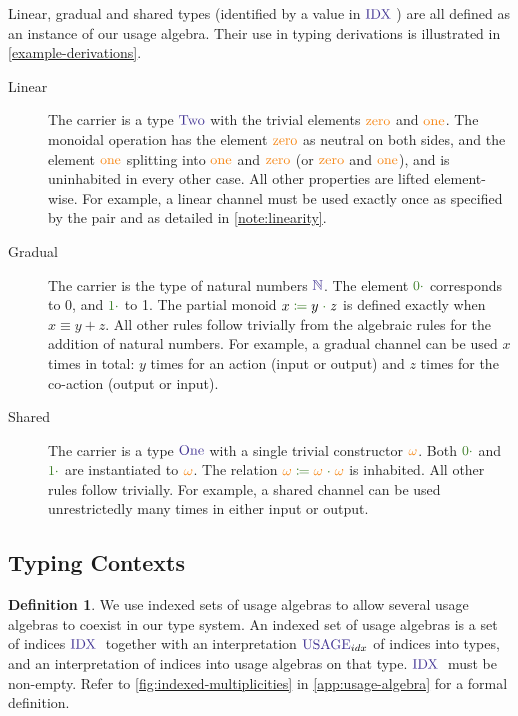 \documentclass[a4paper,UKenglish,cleveref,autoref,thm-restate,authorcolumns]{lipics-v2019}
\theoremstyle{definition}
\newtheorem{nidefinition}[theorem]{Definition}
\newcommand{\type}[1]{\textcolor{BlueViolet}{\operatorname{#1}}}
\newcommand{\constr}[1]{\textcolor{BurntOrange}{\operatorname{#1}}}
\newcommand{\func}[1]{\textcolor{OliveGreen}{\operatorname{#1}}}
\newcommand{\op}[3]{#1 \; \func{\coloneqq} \; #2 \; \func{\cdot} \; #3}
\newcommand{\zero}{\func{0\cdot}}
\newcommand{\one}{\func{1\cdot}}
\newcommand{\Idx}{\type{IDX}\;}
\newcommand{\Usage}{\type{USAGE}}
\newcommand{\N}{\type{\mathbb{N}}}
\begin{document}
Linear, gradual and shared types (identified by a value in $\Idx$) are all defined as an instance of our usage algebra.
Their use in typing derivations is illustrated in \autoref{example-derivations}.
\begin{description}
  \item [Linear]
    The carrier is a type $\type{Two}$ with the trivial elements $\constr{zero}$ and $\constr{one}$.
    The monoidal operation has the element $\constr{zero}$ as neutral on both sides, and the element $\constr{one}$ splitting into $\constr{one}$ and $\constr{zero}$ (or $\constr{zero}$ and $\constr{one}$), and is uninhabited in every other case.
    All other properties are lifted element-wise.
    For example, a linear channel must be used exactly once as specified by the pair and as detailed in \autoref{note:linearity}.

    \item [Gradual]
    The carrier is the type of natural numbers $\N$.
    The element $\zero$ corresponds to 0, and $\one$ to 1.
    The partial monoid $\op{x}{y}{z}$ is defined exactly when $x \equiv y + z$.
    All other rules follow trivially from the algebraic rules for the addition of natural numbers.
    For example, a gradual channel can be used $x$ times in total: $y$ times for an action (input or output) and $z$ times for the co-action (output or input).

    \item [Shared]
    The carrier is a type $\type{One}$ with a single trivial constructor $\constr{\omega}$.
    Both $\zero$ and $\one$ are instantiated to $\constr{\omega}$.
    The relation $\op{\constr{\omega}}{\constr{\omega}}{\constr{\omega}}$ is inhabited.
    All other rules follow trivially.
    For example, a shared channel can be used unrestrictedly many times in either input or output.
\end{description}
\subsection{Typing Contexts}
\label{contexts}
\begin{nidefinition}
  We use indexed sets of usage algebras to allow several usage algebras to coexist in our type system.
  An indexed set of usage algebras is a set of indices $\Idx$ together with an interpretation $\Usage_{idx}$ of indices into types, and an interpretation of indices into usage algebras on that type.
  $\Idx$ must be non-empty.
  Refer to \autoref{fig:indexed-multiplicities} in \autoref{app:usage-algebra} for a formal definition.
\end{nidefinition}
\end{document}
